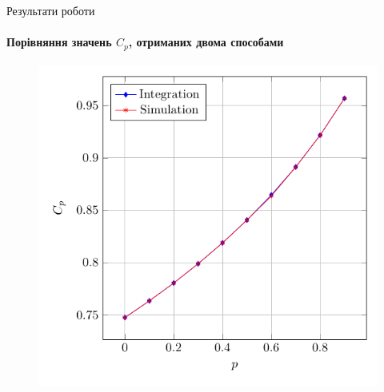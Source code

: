 \begin{frame}{Результати роботи}
\framesubtitle{Порівняння значень $C_{p}$, отриманих двома способами}
\begin{figure}
	\centering
	\includegraphics[scale=0.8]{im/composite_cp}
\end{figure}
\end{frame}


